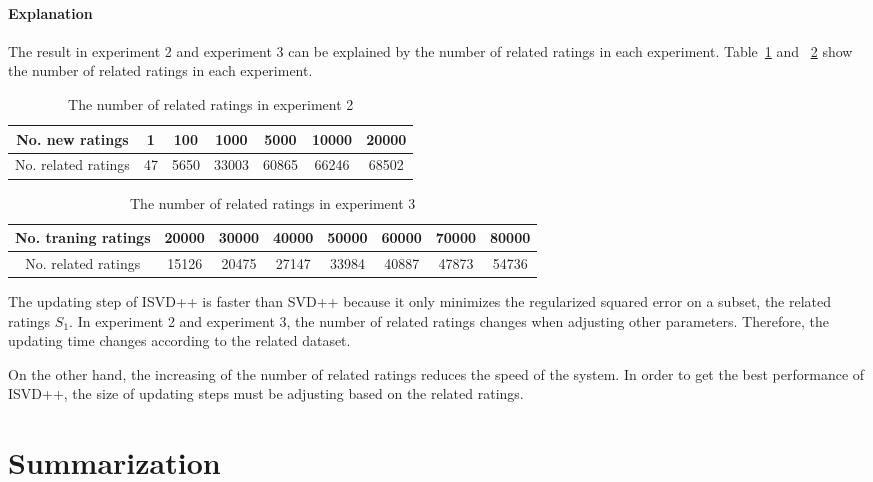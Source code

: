 \documentclass[oneside,13pt]{extreport}
\begin{document}
\subsubsection{Explanation}
The result in experiment 2 and experiment 3 can be explained by the number of related ratings in each experiment. Table~\ref{tab:related_1} and ~\ref{tab:related_2} show the number of related ratings in each experiment.
\begin{table}[h!]
    \small\centering
    \begin{tabular}{|c|c|c|c|c|c|c|}
        \hline
        No. new ratings & 1 &	100 &	1000&	5000&	10000&	20000\\
        \hline
         No. related ratings & 47&	5650&	33003&	60865&	66246&	68502 \\
        \hline
    \end{tabular}
    \caption{ The number of related ratings in experiment 2}
    \label{tab:related_1}
\end{table}

\begin{table}[h!]
    \small\centering
    \begin{tabular}{|c|c|c|c|c|c||c|c|}
        \hline
        No. traning ratings & 20000	&30000	&40000	&50000&	60000&	70000&	80000\\
        \hline
         No. related ratings & 15126&	20475&	27147&	33984&	40887&	47873&	54736\\
        \hline
    \end{tabular}
    
    \caption{ The number of related ratings in experiment 3}
    \label{tab:related_2}
\end{table}

The updating step of ISVD++ is faster than SVD++ because it only minimizes the regularized squared error on a subset, the related ratings $S_1$. In experiment 2 and experiment 3, the number of related ratings changes when adjusting other parameters. Therefore, the updating time changes according to the related dataset. 

On the other hand, the increasing of the number of related ratings reduces the speed of the system. In order to get the best performance of ISVD++, the size of updating steps must be adjusting based on the related ratings.

\chapter{Summarization}
\label{Summarization}
\end{document}

